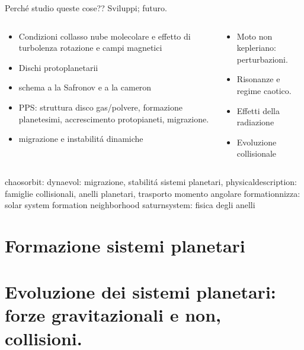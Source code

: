 \documentclass[10pt,xcolor={usenames},fleqn,mathserif,serif]{beamer}
\begin{document}
\begin{wordonframe}{Perch\'e studio queste cose?? Sviluppi; futuro.}
\begin{columns}[T]\begin{column}{0.5\textwidth}
\begin{itemize}
\item Condizioni collasso nube molecolare e effetto di turbolenza rotazione e campi magnetici
\item Dischi protoplanetarii
\item schema a la Safronov e a la cameron
\item PPS: struttura disco gas/polvere, formazione planetesimi, accrescimento protopianeti, migrazione.
\item migrazione e instabilit\'a dinamiche
\end{itemize}
\end{column} \begin{column}{0.5\textwidth}
\begin{itemize}
\item Moto non kepleriano: perturbazioni.
\item Risonanze e regime caotico.
\item Effetti della radiazione
\item Evoluzione collisionale
\end{itemize}
\end{column}  \end{columns}

chaosorbit:
dynaevol: migrazione, stabilit\'a sistemi planetari,
physicaldescription: famiglie collisionali, anelli planetari, trasporto momento angolare
formationnizza: solar system formation neighborhood
saturnsystem: fisica degli anelli
\end{wordonframe}

\part{Formazione sistemi planetari}


\part{Evoluzione dei sistemi planetari: forze gravitazionali e non, collisioni.}


\end{document}
